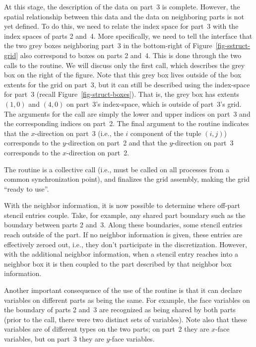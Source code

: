 At this stage, the description of the data on part~3 is complete.  However, the
spatial relationship between this data and the data on neighboring parts is not
yet defined.  To do this, we need to relate the index space for part~3 with the
index spaces of parts 2 and~4.  More specifically, we need to tell the
interface that the two grey boxes neighboring part~3 in the bottom-right of
Figure~\ref{fig-sstruct-grid} also correspond to boxes on parts 2 and~4.  This
is done through the two calls to the  routine.  We will
discuss only the first call, which describes the grey box on the right of the
figure.  Note that this grey box lives outside of the box extents for the grid
on part~3, but it can still be described using the index-space for part~3
(recall Figure~\ref{fig-struct-boxes}).  That is, the grey box has extents
$(1,0)$ and $(4,0)$ on part~3's index-space, which is outside of part~3's grid.
The arguments for the  call are simply the lower and
upper indices on part~3 and the corresponding indices on part~2.  The final
argument to the routine indicates that the $x$-direction on part~3 (i.e., the
$i$ component of the tuple $(i,j)$) corresponds to the $y$-direction on part~2
and that the $y$-direction on part~3 corresponds to the $x$-direction on
part~2.

The  routine is a collective call (i.e., must be called on all
processes from a common synchronization point), and finalizes the grid
assembly, making the grid ``ready to use''.

With the neighbor information, it is now possible to determine where off-part
stencil entries couple.  Take, for example, any shared part boundary such as
the boundary between parts 2 and~3.  Along these boundaries, some stencil
entries reach outside of the part.  If no neighbor information is given, these
entries are effectively zeroed out, i.e., they don't participate in the
discretization.  However, with the additional neighbor information, when a
stencil entry reaches into a neighbor box it is then coupled to the part
described by that neighbor box information.

Another important consequence of the use of the  routine
is that it can declare variables on different parts as being the same.  For
example, the face variables on the boundary of parts 2 and~3 are recognized as
being shared by both parts (prior to the  call, there
were two distinct sets of variables).  Note also that these variables are of
different types on the two parts; on part~2 they are $x$-face variables, but on
part~3 they are $y$-face variables.

